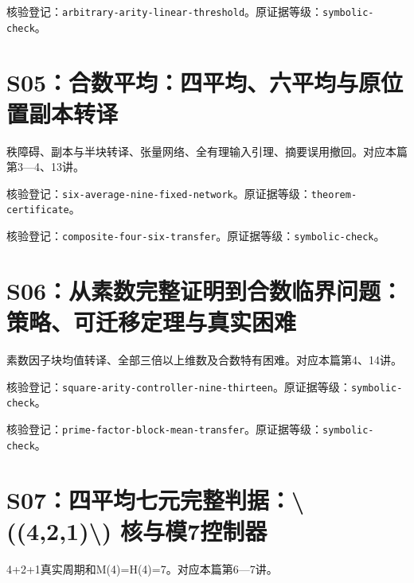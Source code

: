 \documentclass[11pt,a4paper,oneside,openany]{book}
\theoremstyle{definition}\newtheorem{example}[theorem]{例}\newtheorem{conjecture}[theorem]{猜想}
\numberwithin{equation}{chapter}\setcounter{tocdepth}{1}
\begin{document}
\par{}\par

核验登记：{\small\nolinkurl{arbitrary-arity-linear-threshold}}。原证据等级：{\small\nolinkurl{symbolic-check}}。

\section{S05：合数平均：四平均、六平均与原位置副本转译}\label{source:S05}

秩障碍、副本与半块转译、张量网络、全有理输入引理、摘要误用撤回。对应本篇第3—4、13讲。

\par{}\par

核验登记：{\small\nolinkurl{six-average-nine-fixed-network}}。原证据等级：{\small\nolinkurl{theorem-certificate}}。

核验登记：{\small\nolinkurl{composite-four-six-transfer}}。原证据等级：{\small\nolinkurl{symbolic-check}}。

\section{S06：从素数完整证明到合数临界问题：策略、可迁移定理与真实困难}\label{source:S06}

素数因子块均值转译、全部三倍以上维数及合数特有困难。对应本篇第4、14讲。

\par{}\par

核验登记：{\small\nolinkurl{square-arity-controller-nine-thirteen}}。原证据等级：{\small\nolinkurl{symbolic-check}}。

核验登记：{\small\nolinkurl{prime-factor-block-mean-transfer}}。原证据等级：{\small\nolinkurl{symbolic-check}}。

\section{S07：四平均七元完整判据：\textbackslash{}((4,2,1)\textbackslash{}) 核与模7控制器}\label{source:S07}

4+2+1真实周期和M(4)=H(4)=7。对应本篇第6—7讲。
\end{document}
